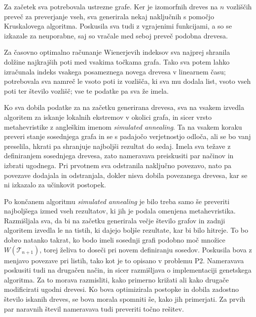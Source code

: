 \documentclass[a4paper, 12 pt]{article}
\begin{document}
\itshape{Za začetek sva potrebovala ustrezne grafe. Ker je izomorfnih dreves na $n$ vozliščih preveč za preverjanje vseh, sva generirala nekaj naključnih s pomočjo Kruskalovega algoritma. Poskusila sva tudi z vgrajenimi funkcijami, a so se izkazale za neuporabne, saj so vračale med seboj preveč podobna drevesa. \newline

Za časovno optimalno računanje Wienerjevih indeksov sva najprej shranila dolžine najkrajših poti med vsakima točkama grafa. Tako sva potem lahko izračunala indeks vsakega posameznega novega drevesa v linearnem času; potrebovala sva namreč le vsoto poti iz vozlišča, ki sva mu dodala list, vsoto vseh poti ter število vozlišč; vse te podatke pa sva že imela. \newline

 Ko sva dobila podatke za na začetku generirana drevesa, sva na vsakem izvedla algoritem za iskanje lokalnih ekstremov v okolici grafa, in sicer vrsto metahevristike z angleškim imenom \textit{simulated annealing}. Ta na vsakem koraku preveri stanje sosednjega grafa in se s padajočo verjetnostjo odloča, ali se bo vanj preselila, hkrati pa shranjuje najboljši rezultat do sedaj. Imela sva težave z definiranjem sosednjega drevesa, zato nameravava preiskusiti par načinov in izbrati ugodnega. Pri prvotnem sva odstranila naključno povezavo, nato pa povezave dodajala in odstranjala, dokler nisva dobila povezanega drevesa, kar se ni izkazalo za učinkovit postopek. \newline

Po končanem algoritmu \textit{simulated annealing} je bilo treba samo še preveriti najboljšega izmed vseh rezultatov, ki jih je podala omenjena metahevristika. Razmišljala sva, da bi na začetku generirala večje število grafov in zadnji algoritem izvedla le na tistih, ki dajejo boljše rezultate, kar bi bilo hitreje. To bo dobro natanko takrat, ko bodo imeli sosednji grafi podobno moč množice $W(\mathscr{T}_{n+1})$, torej želiva to doseči pri novem definiranju sosedov. Poskusila bova z menjavo povezave pri listih, tako kot je to opisano v problemu P2. Nameravava poskusiti tudi na drugačen način, in sicer razmišljava o implementaciji genetskega algoritma. Za to morava razmisliti, kako primerno križati ali kako drugače modificirati ugodni drevesi. Ko bova optimizirala postopke in dobila zadostno število iskanih dreves, se bova morala spomniti še, kako jih primerjati. Za prvih par naravnih števil nameravava tudi preveriti točno rešitev.

}
\end{document}
